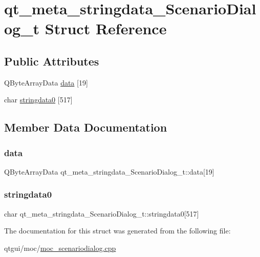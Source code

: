 \hypertarget{structqt__meta__stringdata___scenario_dialog__t}{}\section{qt\+\_\+meta\+\_\+stringdata\+\_\+\+Scenario\+Dialog\+\_\+t Struct Reference}
\label{structqt__meta__stringdata___scenario_dialog__t}
\subsection*{Public Attributes}
\begin{DoxyCompactItemize}
\item 
Q\+Byte\+Array\+Data \mbox{\hyperlink{structqt__meta__stringdata___scenario_dialog__t_a320e726f05a1f28e8b8b4e288c456241}{data}} \mbox{[}19\mbox{]}
\item 
char \mbox{\hyperlink{structqt__meta__stringdata___scenario_dialog__t_a4a477c400cdf9000aa1a8beff0bb6cf7}{stringdata0}} \mbox{[}517\mbox{]}
\end{DoxyCompactItemize}


\subsection{Member Data Documentation}
\mbox{\label{structqt__meta__stringdata___scenario_dialog__t_a320e726f05a1f28e8b8b4e288c456241}} 
\subsubsection{\texorpdfstring{data}{data}}
{\footnotesize\ttfamily Q\+Byte\+Array\+Data qt\+\_\+meta\+\_\+stringdata\+\_\+\+Scenario\+Dialog\+\_\+t\+::data\mbox{[}19\mbox{]}}

\mbox{\label{structqt__meta__stringdata___scenario_dialog__t_a4a477c400cdf9000aa1a8beff0bb6cf7}} 
\subsubsection{\texorpdfstring{stringdata0}{stringdata0}}
{\footnotesize\ttfamily char qt\+\_\+meta\+\_\+stringdata\+\_\+\+Scenario\+Dialog\+\_\+t\+::stringdata0\mbox{[}517\mbox{]}}



The documentation for this struct was generated from the following file\+:\begin{DoxyCompactItemize}
\item 
qtgui/moc/\mbox{\hyperlink{moc__scenariodialog_8cpp}{moc\+\_\+scenariodialog.\+cpp}}\end{DoxyCompactItemize}
